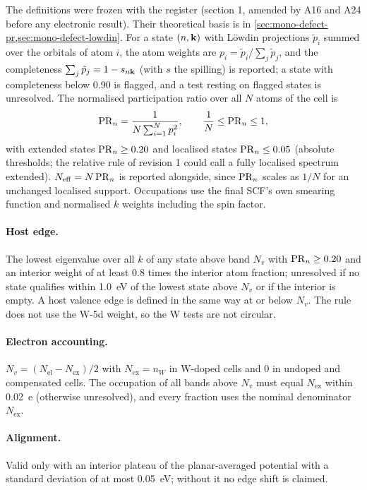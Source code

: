 The definitions were frozen with the register (section 1, amended by A16 and A24 before any electronic result). Their
theoretical basis is in \cref{sec:mono-defect-pr,sec:mono-defect-lowdin}. For a state $(n,\mathbf{k})$ with L\"owdin
projections $\tilde p_{i}$ summed over the orbitals of atom $i$, the atom weights are $p_i = \tilde p_i/\sum_j\tilde
p_j$, and the completeness $\sum_j \tilde p_j = 1 - s_{n\mathbf{k}}$ (with $s$ the spilling) is reported; a state with
completeness below 0.90 is flagged, and a test resting on flagged states is unresolved. The normalised participation
ratio over all $N$ atoms of the cell is
\begin{equation}
\mathrm{PR}_{n} = \frac{1}{N\sum_{i=1}^{N} p_i^2}, \qquad \frac{1}{N} \le \mathrm{PR}_{n} \le 1 ,
\label{eq:mono-am-pr}
\end{equation}
with extended states $\mathrm{PR}_{n} \ge 0.20$ and localised states $\mathrm{PR}_{n} \le 0.05$ (absolute thresholds; the relative rule of
revision 1 could call a fully localised spectrum extended). $N_{\mathrm{eff}} = N\,\mathrm{PR}_{n}$ is reported alongside, since
$\mathrm{PR}_{n}$ scales as $1/N$ for an unchanged localised support. Occupations use the final SCF's own smearing function and
normalised $k$ weights including the spin factor.

\paragraph{Host edge.} The lowest eigenvalue over all $k$ of any state above band $N_v$ with $\mathrm{PR}_{n}\ge0.20$ and an
interior weight of at least 0.8 times the interior atom fraction; unresolved if no state qualifies within 1.0~eV of the
lowest state above $N_v$ or if the interior is empty. A host valence edge is defined in the same way at or below
$N_v$. The rule does not use the W-5d weight, so the W tests are not circular.

\paragraph{Electron accounting.} $N_v = (N_{\mathrm{el}} - N_{\mathrm{ex}})/2$ with $N_{\mathrm{ex}} = n_W$ in W-doped
cells and 0 in undoped and compensated cells. The occupation of all bands above $N_v$ must equal $N_{\mathrm{ex}}$ within
0.02~e (otherwise unresolved), and every fraction uses the nominal denominator $N_{\mathrm{ex}}$.

\paragraph{Alignment.} Valid only with an interior plateau of the planar-averaged potential with a standard deviation
of at most 0.05~eV; without it no edge shift is claimed.


